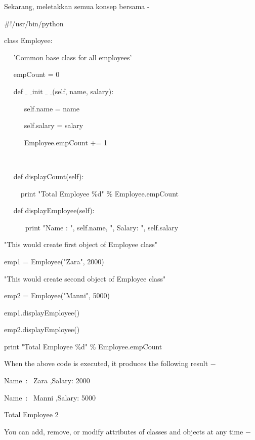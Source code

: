 \begin {enumerate}
\noindent 
Sekarang, meletakkan semua konsep bersama - \par
\noindent 
 $  \#  $!/usr/bin/python \par
\vspace{12pt}
\noindent 
class Employee: \par
\noindent 
~~ 'Common base class for all employees' \par
\noindent 
~~ empCount = 0 \par
\vspace{12pt}
\noindent 
~~ def  $  \_  $ $  \_  $init $  \_  $ $  \_  $(self, name, salary): \par
\noindent 
~~~~~ self.name = name \par
\noindent 
~~~~~ self.salary = salary \par
\noindent 
~~~~~ Employee.empCount += 1 \par
\noindent 
~~  \par
\noindent 
~~ def displayCount(self): \par
\noindent 
~~~~ print "Total Employee  $  \%  $d"  $  \%  $ Employee.empCount \par
\vspace{12pt}
\noindent 
~~ def displayEmployee(self): \par
\noindent 
~~~~~~print "Name : ", self.name,  ", Salary: ", self.salary \par
\vspace{12pt}
\noindent 
"This would create first object of Employee class" \par
\noindent 
emp1 = Employee("Zara", 2000) \par
\noindent 
"This would create second object of Employee class" \par
\noindent 
emp2 = Employee("Manni", 5000) \par
\noindent 
emp1.displayEmployee() \par
\noindent 
emp2.displayEmployee() \par
\noindent 
print "Total Employee  $  \%  $d"  $  \%  $ Employee.empCount \par
\noindent 
When the above code is executed, it produces the following result  $ - $ \par
\noindent 
Name~:~ Zara ,Salary:  2000 \par
\noindent 
Name~:~ Manni ,Salary:  5000 \par
\noindent 
Total Employee 2 \par
\noindent 
You can add, remove, or modify attributes of classes and objects at any time  $ - $ \par

\end{enumerate}

